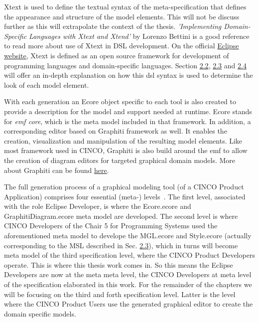 Xtext is used to define the textual syntax of the meta-specification that defines the appearance and structure of the model elements. This will not be discuss further as this will extrapolate the context of the thesis.  \textit{'Implementing Domain-Specific Languages with Xtext and Xtend'} by Lorenzo Bettini is a good reference to read more about use of Xtext in DSL development. On the official \href{https://www.eclipse.org/Xtext/}{Eclipse website}, Xtext is defined as an open source framework for development of programming languages and domain-specific languages. Section \hyperref[sec:MGL]{2.2}, \hyperref[sec:MSL]{2.3} and \hyperref[sec:CPD]{2.4} will offer an in-depth explanation on how this \acrshort{dsl} syntax is used to determine the look of each model element.

With each generation an Ecore object specific to each tool is also created to provide a description for the model and support needed at runtime. Ecore stands for \textit{\acrfull{emf} core}, which is the meta model included in that framework. In addition, a corresponding editor based on Graphiti framework as well. It enables the creation, visualization and manipulation of the resulting model elements. Like most framework used in CINCO, Graphiti is also build around the \acrshort{emf} to allow the creation of diagram editors for targeted graphical domain models. More about Graphiti can be found \href{https://www.eclipse.org/graphiti/}{here}.

The full generation process of a graphical modeling tool (of a CINCO Product Application) comprises four essential (meta-) levels~\cite{Naujokat2018}. The first level, associated with the role Eclipse Developer, is where the Ecore.ecore and GraphitiDiagram.ecore meta model are developed. The second level is where CINCO Developers of the Chair 5 for Programming Systems used the aforementioned meta model to develope the MGL.ecore and Style.ecore (actually corresponding to the MSL described in Sec. \hyperref[sec:MSL]{2.3}), which in turns will become meta model of the third specification level, where the CINCO Product Developers operate. This is where this thesis work comes in. So this means the Eclipse Developers are now at the meta meta level, the CINCO Developers at meta level of the specification elaborated in this work. For the remainder of the chapters we will be focusing on the third and forth specification level. Latter is the level where the CINCO Product Users use the generated graphical editor to create the domain specific models. 

